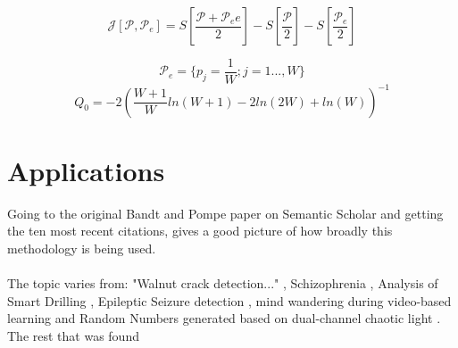 $$\mathscr{J}[\mathscr{P},\mathscr{P}_e]=S[\frac{\mathscr{P}+\mathscr{P}_ee}{2}]-S[\frac{\mathscr{P}}{2}]-S[\frac{\mathscr{P}_e}{2}]$$

$$\mathscr{P}_e=\{p_j=\frac{1}{W};j=1...,W\}$$
$$Q_0 = -2(\frac{W+1}{W}ln(W+1)-2ln(2W)+ln(W))^{-1}$$
\cite{Amigo2023b}

\section{Applications}
Going to the original Bandt and Pompe paper \cite{Bandt2002} on Semantic Scholar and getting the ten most recent citations, gives a good picture of how broadly this methodology is being used.
\\\\
The topic varies from: "Walnut crack detection..." \cite{Zhang2024}, Schizophrenia \cite{Wang2024}, Analysis of Smart Drilling \cite{Szwajka2024}, Epileptic Seizure detection \cite{AbhishekParikh2024}, mind wandering during video-based learning \cite{Tang2024} and Random Numbers generated based on dual-channel chaotic light \cite{Liu2024}. The rest that was found \cite{Demirel2024, Du2024, Sun2024, Li2024}